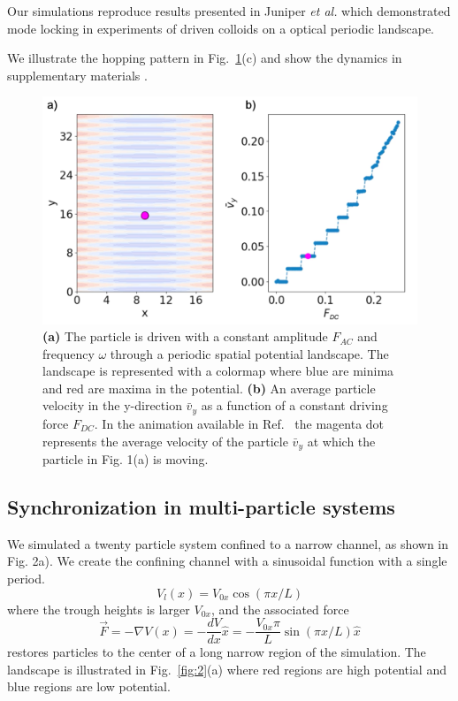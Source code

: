 \documentclass[prb,preprint]{revtex4}
\begin{document}
Our simulations reproduce results presented in 
Juniper {\it et al.} \cite{juniper2015}
which demonstrated
mode locking in
experiments of 
driven colloids on a
optical periodic landscape.

We illustrate the hopping pattern in Fig.~\ref{fig:1}(c)
and 
show the dynamics 
in supplementary materials \cite{supp1}.

\begin{center}
\begin{figure}[h!]
\centering
\includegraphics[scale=.25]{single}
\caption{\textbf{(a)} The particle is driven with a constant amplitude $F_{AC}$ and frequency $\omega$ through a periodic spatial potential landscape.  The landscape is represented with a colormap where blue are minima and red are maxima in the potential. \textbf{(b)} An average particle velocity in the y-direction $\bar{v}_{y}$ as a function of a constant driving force $F_{DC}$. In the animation available in Ref.~\cite{supp1} the magenta dot represents the average velocity of the particle $\bar{v}_{y}$ at which the particle in Fig. 1(a) is moving.}
\label{fig:1}
\end{figure}
\end{center}

\subsection{Synchronization in multi-particle systems}
\label{sec:sync}

We simulated a twenty particle system confined to a narrow channel, as shown in Fig. 2a).  We create the confining channel with a sinusoidal function
with a single period.
\begin{equation}
  \label{eq:channel}
  V_l(x) = V_{0x} \cos{(\pi x/L)}
\end{equation}
where the trough heights is larger  $V_{0x}$,
and the associated force
\begin{equation}
\vec{F}=-\nabla V(x) = -\frac{dV}{dx} \hat{x} = - \frac{V_{0x} \pi}{L} \sin{(\pi x/L)} \hat{x}
\end{equation}
restores particles to the center of a long narrow region of the simulation.
The landscape is illustrated in Fig.~\ref{fig:2}(a)
where red regions are high potential
and blue regions are low potential.
\end{document}
